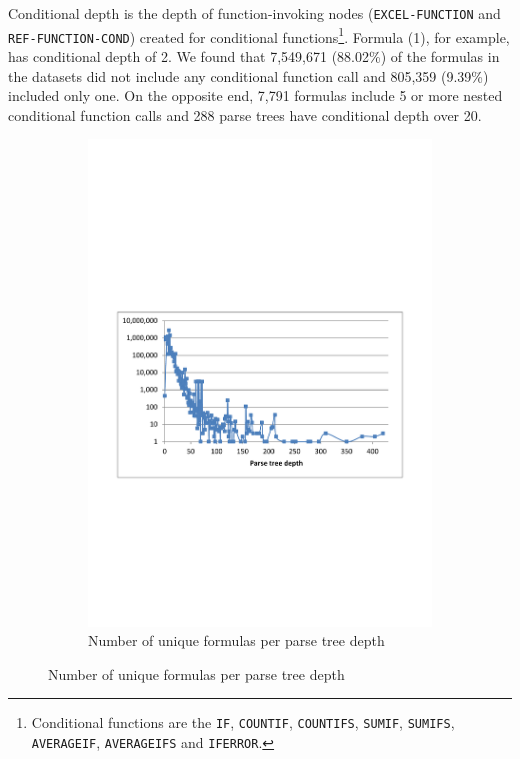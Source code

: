 \documentclass[times]{smrauth}
\begin{document}
Conditional depth is the depth of function-invoking nodes (\texttt{EXCEL-FUNCTION} and \texttt{REF-FUNCTION-COND}) created for conditional functions\footnote{Conditional functions are the \texttt{IF}, \texttt{COUNTIF}, \texttt{COUNTIFS}, \texttt{SUMIF}, \texttt{SUMIFS}, \texttt{AVERAGEIF}, \texttt{AVERAGEIFS} and \texttt{IFERROR}.}. Formula (1), for example, has conditional depth of 2. We found that 7,549,671 (88.02\%) of the formulas in the datasets did not include any conditional function call and 805,359 (9.39\%) included only one. On the opposite end, 7,791 formulas include 5 or more nested conditional function calls and 288 parse trees have conditional depth over 20.
\begin{figure}
	\centering
	\begin{subfigure}[b]{0.49\textwidth}
		\centering
		\includegraphics[width=1\textwidth]{img/depths1}
		\caption{Number of unique formulas per parse tree depth}

\end{subfigure}
\end{figure}
\end{document}
